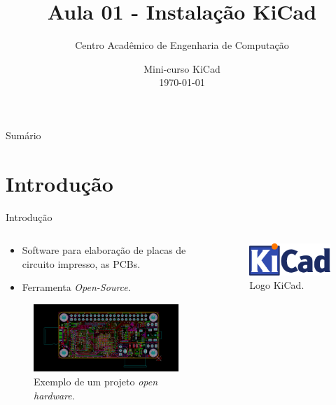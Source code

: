\documentclass{beamer}
\title[Aula 01 - Instalação]{Aula 01 - Instalação KiCad}
\author[CAECP]{Centro Acadêmico de Engenharia de Computação}
\institute[UTFPR] 
{
  Departamento de Informática - DAINF \\
  Universidade Tecnológica Federal do Paraná
}
\date[\today]{Mini-curso KiCad\\\today}
\begin{document}
\begin{frame}
  \titlepage
\end{frame}

\begin{frame}{Sumário}
  \tableofcontents
\end{frame}

\section{Introdução}
\begin{frame}{Introdução}
	\begin{columns}
		\begin{column}{0.5\textwidth}
			\begin{itemize}
				\item Software para elaboração de placas de circuito impresso, as PCBs.
				\item Ferramenta \textit{Open-Source}.
			\end{itemize}
			\begin{figure}
				\centering
				\includegraphics[width=1\textwidth]{Imagens/exemplo.png}
				\caption{Exemplo de um projeto \textit{open hardware}.}
			\end{figure}
		\end{column}
		\begin{column}{0.5\textwidth}
			\begin{figure}
				\centering
				\includegraphics[width=1.0\textwidth]{Imagens/KiCad-Logo.eps}
				\caption{Logo KiCad.}
			\end{figure}
		\end{column}
	\end{columns}
\end{frame}
\end{document}
